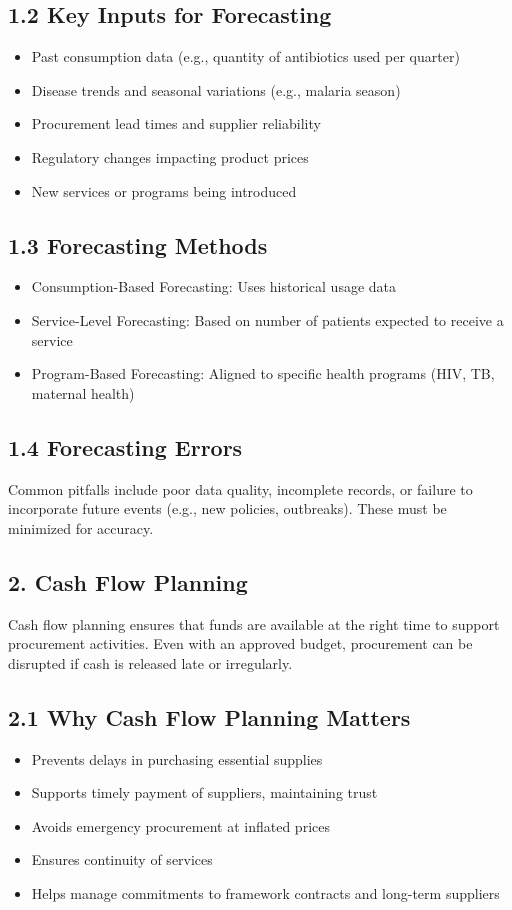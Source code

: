 \documentclass[10pt]{article}
\begin{document}
\subsection*{1.2 Key Inputs for Forecasting}
\begin{itemize}
  \item Past consumption data (e.g., quantity of antibiotics used per quarter)
  \item Disease trends and seasonal variations (e.g., malaria season)
  \item Procurement lead times and supplier reliability
  \item Regulatory changes impacting product prices
  \item New services or programs being introduced
\end{itemize}

\subsection*{1.3 Forecasting Methods}
\begin{itemize}
  \item Consumption-Based Forecasting: Uses historical usage data
  \item Service-Level Forecasting: Based on number of patients expected to receive a service
  \item Program-Based Forecasting: Aligned to specific health programs (HIV, TB, maternal health)
\end{itemize}

\subsection*{1.4 Forecasting Errors}
Common pitfalls include poor data quality, incomplete records, or failure to incorporate future events (e.g., new policies, outbreaks). These must be minimized for accuracy.

\subsection*{2. Cash Flow Planning}
Cash flow planning ensures that funds are available at the right time to support procurement activities. Even with an approved budget, procurement can be disrupted if cash is released late or irregularly.

\subsection*{2.1 Why Cash Flow Planning Matters}
\begin{itemize}
  \item Prevents delays in purchasing essential supplies
  \item Supports timely payment of suppliers, maintaining trust
  \item Avoids emergency procurement at inflated prices
  \item Ensures continuity of services
  \item Helps manage commitments to framework contracts and long-term suppliers
\end{itemize}
\end{document}
